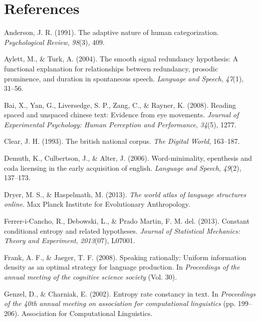 \documentclass[10pt, letterpaper]{article}
\begin{document}
\section{References}\label{references}

\setlength{\parindent}{-0.1in} \setlength{\leftskip}{0.125in} \noindent

\hypertarget{refs}{}
\hypertarget{ref-anderson1991}{}
Anderson, J. R. (1991). The adaptive nature of human categorization.
\emph{Psychological Review}, \emph{98}(3), 409.

\hypertarget{ref-aylett2004}{}
Aylett, M., \& Turk, A. (2004). The smooth signal redundancy hypothesis:
A functional explanation for relationships between redundancy, prosodic
prominence, and duration in spontaneous speech. \emph{Language and
Speech}, \emph{47}(1), 31--56.

\hypertarget{ref-bai2008}{}
Bai, X., Yan, G., Liversedge, S. P., Zang, C., \& Rayner, K. (2008).
Reading spaced and unspaced chinese text: Evidence from eye movements.
\emph{Journal of Experimental Psychology: Human Perception and
Performance}, \emph{34}(5), 1277.

\hypertarget{ref-clear1993}{}
Clear, J. H. (1993). The british national corpus. \emph{The Digital
World}, 163--187.

\hypertarget{ref-demuth2006}{}
Demuth, K., Culbertson, J., \& Alter, J. (2006). Word-minimality,
epenthesis and coda licensing in the early acquisition of english.
\emph{Language and Speech}, \emph{49}(2), 137--173.

\hypertarget{ref-dryer2013}{}
Dryer, M. S., \& Haspelmath, M. (2013). \emph{The world atlas of
language structures online}. Max Planck Institute for Evolutionary
Anthropology.

\hypertarget{ref-ferrer-i-cancho2013}{}
Ferrer-i-Cancho, R., Debowski, L., \& Prado Martin, F. M. del. (2013).
Constant conditional entropy and related hypotheses. \emph{Journal of
Statistical Mechanics: Theory and Experiment}, \emph{2013}(07), L07001.

\hypertarget{ref-frank2008}{}
Frank, A. F., \& Jaeger, T. F. (2008). Speaking rationally: Uniform
information density as an optimal strategy for language production. In
\emph{Proceedings of the annual meeting of the cognitive science
society} (Vol. 30).

\hypertarget{ref-genzel2002}{}
Genzel, D., \& Charniak, E. (2002). Entropy rate constancy in text. In
\emph{Proceedings of the 40th annual meeting on association for
computational linguistics} (pp. 199--206). Association for Computational
Linguistics.
\end{document}
